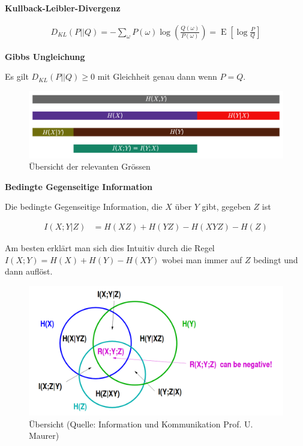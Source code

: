 \documentclass[25pt]{sciposter}
\newcommand{\E}{\operatorname{E}}
\newenvironment{defn}[1]{\begin{mdframed}[backgroundcolor=blue!10,innertopmargin=15pt, nobreak=true,innerbottommargin=15pt]
		\textbf{#1 }
	}
	{ 
	\end{mdframed}
}
\newenvironment{thm}[1]{\begin{mdframed}[nobreak=true,backgroundcolor=Emerald!10,innertopmargin=15pt, innerbottommargin=15pt]
		\textbf{#1 }
	}
	{ 
	\end{mdframed}
}
\begin{document}
\begin{multicols}{3}
\begin{defn}{Kullback-Leibler-Divergenz}
	\begin{align*}
		D_{KL} (P||Q) = -\sum_{\omega}P(\omega) \log\left( \frac{Q(\omega)}{P(\omega)} \right) = \E \left[\log\frac{P}{Q}\right]
	\end{align*}
\end{defn}

\begin{thm}{Gibbs Ungleichung}
	Es gilt $D_{KL}(P||Q)\geq 0 $ mit Gleichheit genau dann wenn $P=Q$.
\end{thm}


\begin{figure}
	\centering
	\includegraphics[width=1\linewidth]{overviewChpt1}
	\caption{Übersicht der relevanten Grössen}
	\label{fig:overviewchpt1}
\end{figure}
\begin{defn}{Bedingte Gegenseitige Information}
	Die bedingte Gegenseitige Information, die $X$ über $Y$ gibt, gegeben $Z$ ist 
	
	\begin{align*}
	I(X;Y|Z) &= H(XZ) + H(YZ)- H(XYZ) - H(Z)
	\end{align*}
	
	Am besten erklärt man sich dies Intuitiv durch die Regel $I(X;Y) = H(X) + H(Y) - H(XY)$ wobei man immer auf $Z$ bedingt und dann auflöst.
	
\end{defn}

\begin{figure}
	\centering
	\includegraphics[width=0.8\linewidth]{overviewChpt2}
	\caption{Übersicht (Quelle: Information und Kommunikation Prof. U. Maurer)}
	\label{fig:overviewchpt2}
\end{figure}



\end{multicols}
\end{document}
